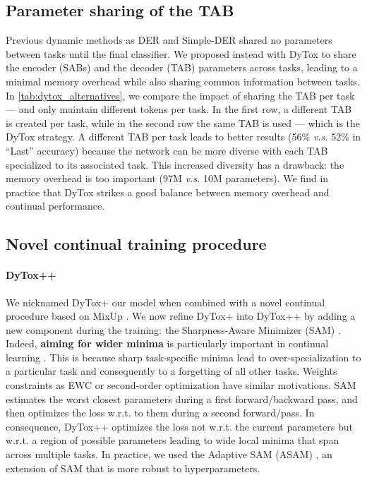 





\subsection{Parameter sharing of the TAB}

Previous dynamic methods as DER \cite{yan2021der} and Simple-DER \cite{li2021preserve} shared no
parameters between tasks until the final classifier. We proposed instead with DyTox to share the
encoder (SABs) and the decoder (TAB) parameters across tasks, leading to a minimal memory overhead
while also sharing common information between tasks. In \autoref{tab:dytox_alternatives}, we compare the
impact of sharing the TAB per task --- and only maintain different tokens per task. In the first
row, a different TAB is created per task, while in the second row the same TAB is used --- which is
the DyTox strategy. A different TAB per task leads to better results (56\% \textit{v.s.} 52\% in
``Last'' accuracy) because the network can be more diverse with each TAB specialized to its
associated task. This increased diversity has a drawback: the memory overhead is too important (97M
\textit{v.s.} 10M parameters). We find in practice that DyTox strikes a good balance between memory
overhead and continual performance.



\subsection{Novel continual training procedure}
\label{sec:plusplus}


\paragraph{DyTox++} We nicknamed DyTox+ our model when combined with a novel continual procedure
based on MixUp \cite{hingyi2018mixup}. We now refine DyTox+ into DyTox++ by adding a new component
during the training: the Sharpness-Aware Minimizer (SAM) \cite{kwon2021asam}. Indeed, \textbf{aiming
      for wider minima} is particularly important in continual learning
\cite{kirkpatrick2017ewc,verwimp2021rehearsalrevealed}. This is because sharp task-specific minima
lead to over-specialization to a particular task and consequently to a forgetting of all other
tasks. Weights constraints as EWC \cite{kirkpatrick2017ewc} or second-order optimization
\cite{lee2020kroneckercontinual} have similar motivations. SAM estimates the worst closest
parameters during a first forward/backward pass, and then optimizes the loss w.r.t. to them during a
second forward/pass. In consequence, DyTox++ optimizes the loss not w.r.t. the current parameters
but w.r.t. a region of possible parameters leading to wide local minima that span across multiple
tasks. In practice, we used the Adaptive SAM (ASAM) \cite{kwon2021asam}, an extension of SAM that is
more robust to hyperparameters.

